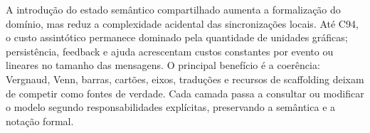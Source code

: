 \documentclass[12pt,a4paper]{article}
\begin{document}
A introdução do estado semântico compartilhado aumenta a formalização do domínio, mas reduz a complexidade acidental das sincronizações locais. Até C94, o custo assintótico permanece dominado pela quantidade de unidades gráficas; persistência, feedback e ajuda acrescentam custos constantes por evento ou lineares no tamanho das mensagens. O principal benefício é a coerência: Vergnaud, Venn, barras, cartões, eixos, traduções e recursos de scaffolding deixam de competir como fontes de verdade. Cada camada passa a consultar ou modificar o modelo segundo responsabilidades explícitas, preservando a semântica e a notação formal.
\end{document}
